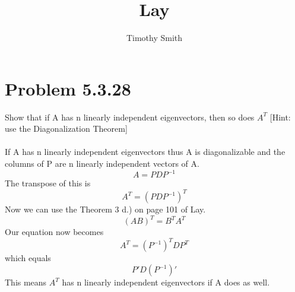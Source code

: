 \documentclass{article}
\begin{document}
\author{Timothy Smith}
\title{Lay}
\maketitle

\section*{Problem 5.3.28}
Show that if A  has n linearly independent eigenvectors, then so does $A^T$ [Hint: use the Diagonalization Theorem]
\\
\\
If A has n linearly independent eigenvectors thus A is diagonalizable and the columns of P are n linearly independent vectors of A. 
\begin{equation}
A=PDP^{-1}
\end{equation}
The transpose of this is 
\begin{equation}
A^T=(PDP^{-1})^T
\end{equation}
Now we can use the Theorem 3 d.) on page 101 of Lay. 
\begin{equation*}
(AB)^T=B^TA^T
\end{equation*}
Our equation now becomes 
\begin{equation}
A^T=(P^{-1})^TDP^T
\end{equation}
which equals
\begin{equation}
P'D(P^{-1})'
\end{equation}
This means $A^T$ has n linearly independent eigenvectors if A does as well. 
\end{document}
